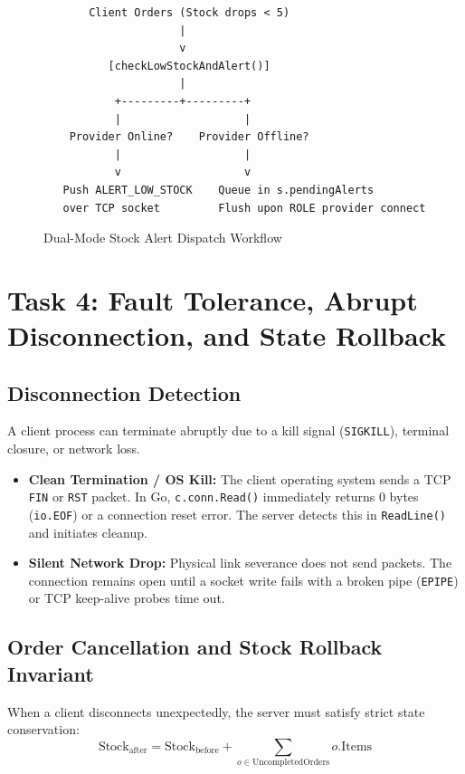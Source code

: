 \documentclass{labreport}
\begin{document}
\begin{figure}[H]
\centering
\begin{verbatim}
       Client Orders (Stock drops < 5)
                     |
                     v
          [checkLowStockAndAlert()]
                     |
           +---------+---------+
           |                   |
    Provider Online?    Provider Offline?
           |                   |
           v                   v
   Push ALERT_LOW_STOCK    Queue in s.pendingAlerts
   over TCP socket         Flush upon ROLE provider connect
\end{verbatim}
\caption{Dual-Mode Stock Alert Dispatch Workflow}
\label{fig:alerts}
\end{figure}

\newpage

\section{Task 4: Fault Tolerance, Abrupt Disconnection, and State Rollback}

\subsection{Disconnection Detection}
A client process can terminate abruptly due to a kill signal (\texttt{SIGKILL}), terminal closure, or network loss.
\begin{itemize}
    \item \textbf{Clean Termination / OS Kill:} The client operating system sends a TCP \texttt{FIN} or \texttt{RST} packet. In Go, \texttt{c.conn.Read()} immediately returns $0$ bytes (\texttt{io.EOF}) or a connection reset error. The server detects this in \texttt{ReadLine()} and initiates cleanup.
    \item \textbf{Silent Network Drop:} Physical link severance does not send packets. The connection remains open until a socket write fails with a broken pipe (\texttt{EPIPE}) or TCP keep-alive probes time out.
\end{itemize}

\subsection{Order Cancellation and Stock Rollback Invariant}
When a client disconnects unexpectedly, the server must satisfy strict state conservation:
\begin{equation}
\text{Stock}_{\text{after}} = \text{Stock}_{\text{before}} + \sum_{o \in \text{UncompletedOrders}} o.\text{Items}
\end{equation}
\end{document}
